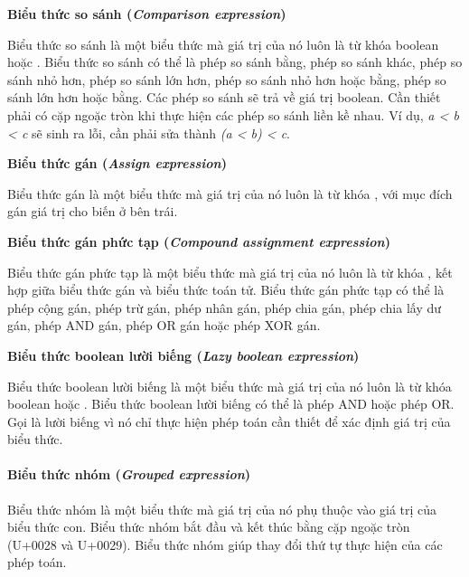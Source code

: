 \noindent\textbf{Biểu thức so sánh (\textit{Comparison expression})}

\regexcompexpr

Biểu thức so sánh là một biểu thức mà giá trị của nó luôn là từ khóa boolean  hoặc . Biểu thức so sánh có thể là phép so sánh bằng, phép so sánh khác, phép so sánh nhỏ hơn, phép so sánh lớn hơn, phép so sánh nhỏ hơn hoặc bằng, phép so sánh lớn hơn hoặc bằng. Các phép so sánh sẽ trả về giá trị boolean. Cần thiết phải có cặp ngoặc tròn khi thực hiện các phép so sánh liền kề nhau. Ví dụ, \textit{a < b < c} sẽ sinh ra lỗi, cần phải sửa thành \textit{(a < b) < c}.

\noindent\textbf{Biểu thức gán (\textit{Assign expression})}

\regexassignexpr

Biểu thức gán là một biểu thức mà giá trị của nó luôn là từ khóa , với mục đích gán giá trị cho biến ở bên trái.

\noindent\textbf{Biểu thức gán phức tạp (\textit{Compound assignment expression})}

\regexcompoundassignexpr

Biểu thức gán phức tạp là một biểu thức mà giá trị của nó luôn là từ khóa , kết hợp giữa biểu thức gán và biểu thức toán tử. Biểu thức gán phức tạp có thể là phép cộng gán, phép trừ gán, phép nhân gán, phép chia gán, phép chia lấy dư gán, phép AND gán, phép OR gán hoặc phép XOR gán.

\noindent\textbf{Biểu thức boolean lười biếng (\textit{Lazy boolean expression})}

\regexlazyboolexpr

Biểu thức boolean lười biếng là một biểu thức mà giá trị của nó luôn là từ khóa boolean  hoặc . Biểu thức boolean lười biếng có thể là phép AND hoặc phép OR. Gọi là lười biếng vì nó chỉ thực hiện phép toán cần thiết để xác định giá trị của biểu thức.

\paragraph{Biểu thức nhóm (\textit{Grouped expression})}

\regexgroupexpr

Biểu thức nhóm là một biểu thức mà giá trị của nó phụ thuộc vào giá trị của biểu thức con. Biểu thức nhóm bắt đầu và kết thúc bằng cặp ngoặc tròn (U+0028 và U+0029). Biểu thức nhóm giúp thay đổi thứ tự thực hiện của các phép toán.

